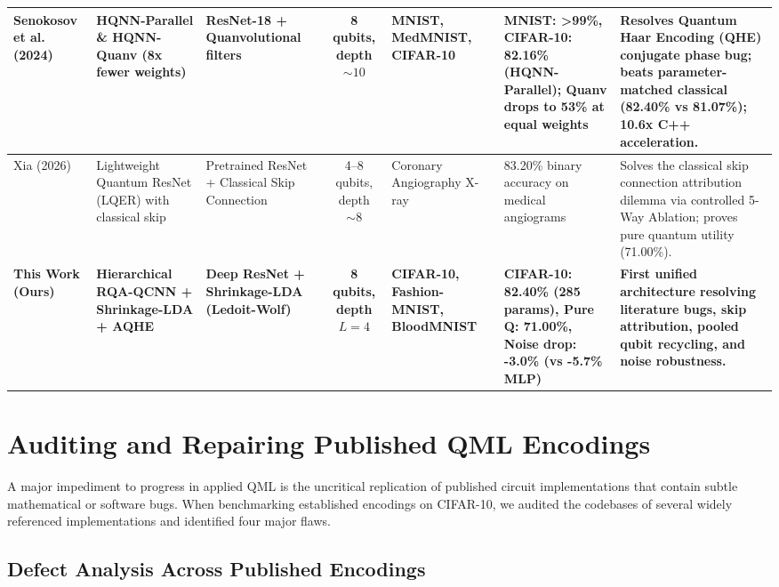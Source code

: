 \documentclass[10pt,twocolumn,twoside,a4paper]{article}
\begin{document}
\begin{table}[t]
{\begin{tabular}{l p{3.2cm} p{2.6cm} c p{2.5cm} p{3.5cm} >{\raggedright\arraybackslash}p{4.2cm}}
\midrule
Senokosov et al. (2024) \cite{senokosov2024quantum} & HQNN-Parallel \& HQNN-Quanv (8x fewer weights) & ResNet-18 + Quanvolutional filters & 8 qubits, depth $\sim 10$ & MNIST, MedMNIST, CIFAR-10 & MNIST: >99\%, CIFAR-10: 82.16\% (HQNN-Parallel); Quanv drops to 53\% at equal weights & Resolves Quantum Haar Encoding (QHE) conjugate phase bug; beats parameter-matched classical (82.40\% vs 81.07\%); 10.6x C++ acceleration. \\
\midrule
Xia (2026) \cite{xia2026lightweight} & Lightweight Quantum ResNet (LQER) with classical skip & Pretrained ResNet + Classical Skip Connection & 4--8 qubits, depth $\sim 8$ & Coronary Angiography X-ray & 83.20\% binary accuracy on medical angiograms & Solves the classical skip connection attribution dilemma via controlled 5-Way Ablation; proves pure quantum utility (71.00\%). \\
\midrule
\textbf{This Work (Ours)} & \textbf{Hierarchical RQA-QCNN + Shrinkage-LDA + AQHE} & \textbf{Deep ResNet + Shrinkage-LDA (Ledoit-Wolf)} & \textbf{8 qubits, depth {$L=4$}} & \textbf{CIFAR-10, Fashion-MNIST, BloodMNIST} & \textbf{CIFAR-10: 82.40\% (285 params), Pure Q: 71.00\%, Noise drop: -3.0\% (vs -5.7\% MLP)} & \textbf{First unified architecture resolving literature bugs, skip attribution, pooled qubit recycling, and noise robustness.} \\
\bottomrule
\end{tabular}%
}
\end{table}


\section{Auditing and Repairing Published QML Encodings}
\label{sec:literature_audit}

A major impediment to progress in applied QML is the uncritical replication of published circuit implementations that contain subtle mathematical or software bugs. When benchmarking established encodings on CIFAR-10, we audited the codebases of several widely referenced implementations and identified four major flaws.

\subsection{Defect Analysis Across Published Encodings}
\end{document}
